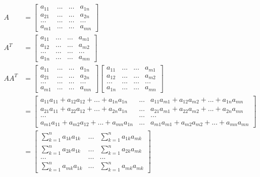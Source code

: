 \documentclass[12pt, letterpaper]{article}
\newcommand{\0}{\textbf{0}}
\newcommand{\1}{\textbf{1}}
\begin{document}
\begin{align*}
A &=\begin{bmatrix}
a_{11} & ... & ... & a_{1n} \\
a_{21} & ... & ... & a_{2n} \\
... & ... & ... & ... \\
a_{m1} & ... & ... & a_{mn}
\end{bmatrix} \\
A^T &= \begin{bmatrix}
a_{11} & ... & ... & a_{m1} \\
a_{12} & ... & ... & a_{m2} \\
... & ... & ... & ... \\
a_{1n} & ... & ... & a_{mn}
\end{bmatrix} \\
AA^T &= 
\begin{bmatrix}
a_{11} & ... & ... & a_{1n} \\
a_{21} & ... & ... & a_{2n} \\
... & ... & ... & ... \\
a_{m1} & ... & ... & a_{mn}
\end{bmatrix}
\begin{bmatrix}
a_{11} & ... & ... & a_{m1} \\
a_{12} & ... & ... & a_{m2} \\
... & ... & ... & ... \\
a_{1n} & ... & ... & a_{mn}
\end{bmatrix} \\
&= 
\begin{bmatrix}
a_{11}a_{11} + a_{12}a_{12} + ... + a_{1n}a_{1n}  & ... & a_{11}a_{m1} + a_{12}a_{m2} + ... + a_{1n}a_{mn} \\
a_{21}a_{11} + a_{22}a_{12} + ... + a_{2n}a_{1n} & ... & a_{21}a_{m1} + a_{22}a_{m2} + ... + a_{2n}a_{mn}  \\
... & ... & ... \\
a_{m1}a_{11} + a_{m2}a_{12} + ... + a_{mn}a_{1n} &  ... & a_{m1}a_{m1} + a_{m2}a_{m2} + ... + a_{mn}a_{mn} 
\end{bmatrix} \\
&= 
\begin{bmatrix}
\sum_{k=1}^{n} a_{1k}a_{1k} & ... & \sum_{k=1}^{n} a_{1k}a_{mk}  \\
\sum_{k=1}^{n} a_{2k}a_{1k}  & ... & \sum_{k=1}^{n} a_{2k}a_{mk}  \\
... & ... & ... \\
\sum_{k=1}^{n} a_{mk}a_{1k} &  ... & \sum_{k=1}^{n} a_{mk}a_{mk} 
\end{bmatrix}
\end{align*}
\end{document}
